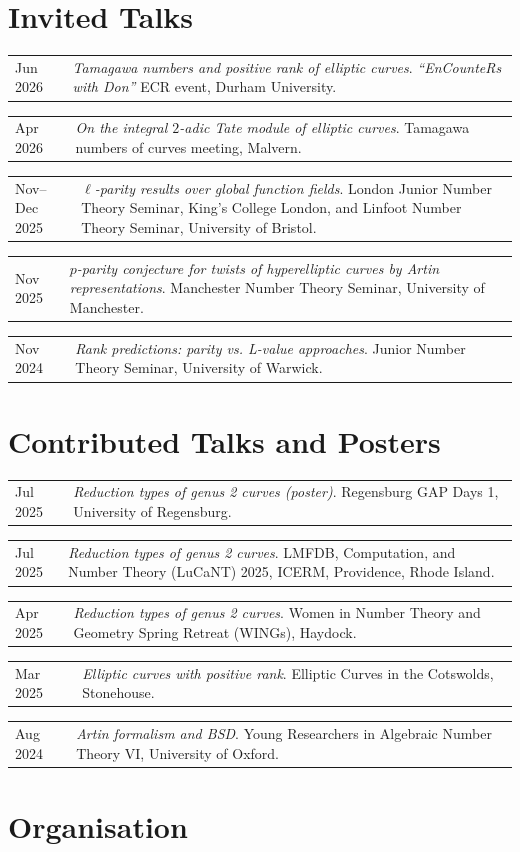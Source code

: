 \documentclass[a4paper,11pt]{article}
\makeatletter
\newcommand{\datedentry}[2]{%
  \begin{tabularx}{\textwidth}{
    @{}>{\raggedleft\arraybackslash}p{2.25cm}
    @{\hspace{0.45cm}}X@{}}
    #1 & #2
  \end{tabularx}\par\vspace{0.5pt}
}
\newcommand{\talk}[3]{%
  \datedentry{#3}{\textit{#1}. #2.}
}
\makeatother
\begin{document}
\section{Invited Talks}

\talk{Tamagawa numbers and positive rank of elliptic curves}
  {\textit{``EnCounteRs with Don''} ECR event, Durham University}
  {Jun 2026}

\talk{On the integral $2$-adic Tate module of elliptic curves}
  {Tamagawa numbers of curves meeting, Malvern}
  {Apr 2026}

\talk{$\ell$-parity results over global function fields}
  {London Junior Number Theory Seminar, King's College London, and
   Linfoot Number Theory Seminar, University of Bristol}
  {Nov--Dec 2025}

\talk{$p$-parity conjecture for twists of hyperelliptic curves by Artin representations}
  {Manchester Number Theory Seminar, University of Manchester}
  {Nov 2025}

\talk{Rank predictions: parity vs. L-value approaches}
  {Junior Number Theory Seminar, University of Warwick}
  {Nov 2024}


\section{Contributed Talks and Posters}

\talk{Reduction types of genus 2 curves (poster)}
  {Regensburg GAP Days 1, University of Regensburg}
  {Jul 2025}

\talk{Reduction types of genus 2 curves}
  {LMFDB, Computation, and Number Theory (LuCaNT) 2025, ICERM,
   Providence, Rhode Island}
  {Jul 2025}

\talk{Reduction types of genus 2 curves}
  {Women in Number Theory and Geometry Spring Retreat (WINGs), Haydock}
  {Apr 2025}

\talk{Elliptic curves with positive rank}
  {Elliptic Curves in the Cotswolds, Stonehouse}
  {Mar 2025}

\talk{Artin formalism and BSD}
  {Young Researchers in Algebraic Number Theory VI, University of Oxford}
  {Aug 2024}

\section{Organisation}
\end{document}
